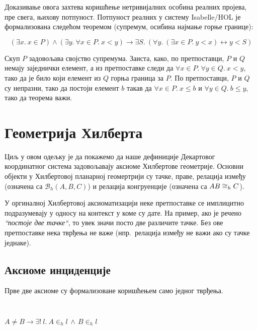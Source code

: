 \documentclass[a4paper, 12pt]{article}
\newcommand{\inh}[2]{\ensuremath{#1 \in_h #2}}
\renewcommand{\beth}[3]{\ensuremath{\mathcal{B}_h(#1, #2, #3)}}
\newcommand{\congrh}[4]{\ensuremath{#1#2 \cong_h #3#4}}
\begin{document}
Доказивање овога захтева коришћење нетривијалних особина реалних
пројева, пре свега, њихову потпуност. Потпуност реалних у систему
Isabelle/HOL је формализована следећом теоремом (супремум, осибина
најмање горње границе):

\vspace{-7mm}
$$(\exists x.\ x \in P) \wedge (\exists y.\ \forall x\in P.\ x < y) \longrightarrow
\exists S.\ (\forall y.\ (\exists x\in P.\ y < x) \leftrightarrow y <
S)$$
\vspace{-7mm}

Скуп $P$ задовољава својство супремума. Заиста, како, по претпоставци,
$P$ и $Q$ немају заједнички елемент, а из претпоставке следи да
$\forall x \in P.\ \forall y \in Q.\ x < y$, тако да је било који
елемент из $Q$ горња граница за $P$. По претпоставци, $P$ и $Q$ су
непразни, тако да постоји елемент $b$ такав да $\forall x \in P.\ x
\leq b$ и $\forall y \in Q.\ b \leq y$, тако да теорема важи.

\section{Геометрија Хилберта}
\label{sec:hilbert}

Циљ у овом одељку је да покажемо да наше дефиниције Декартовог
координатног система задовољавају аксиоме Хилбертове
геометрије. Основни објекти у Хилбертовој планарној геомертрији су
тачке, праве, релација између (означена са $\beth{A}{B}{C}$) и
релација конгруенције (означена са $\congrh{A}{B}{C}$).


У оргиналној Хилбертовој аксиоматизацији \cite{hilbert} неке
претпоставке се имплицитно подразумевају у односу на контекст у коме
су дате. На пример, ако је речено \emph{``постоје две тачке``}, то
увек значи посто две различите тачке. Без ове претпоставке нека
тврђења не важе (нпр.~релација између не важи ако су тачке једнаке).


\subsection{Аксиоме инциденције}

Прве две аксиоме су формализоване коришћењем само једног тврђења.
{\tt
\begin{tabbing}
$A \neq B \longrightarrow \exists!\ l.\ \inh{A}{l} \,\wedge\, \inh{B}{l}$
\end{tabbing}
}
\end{document}
